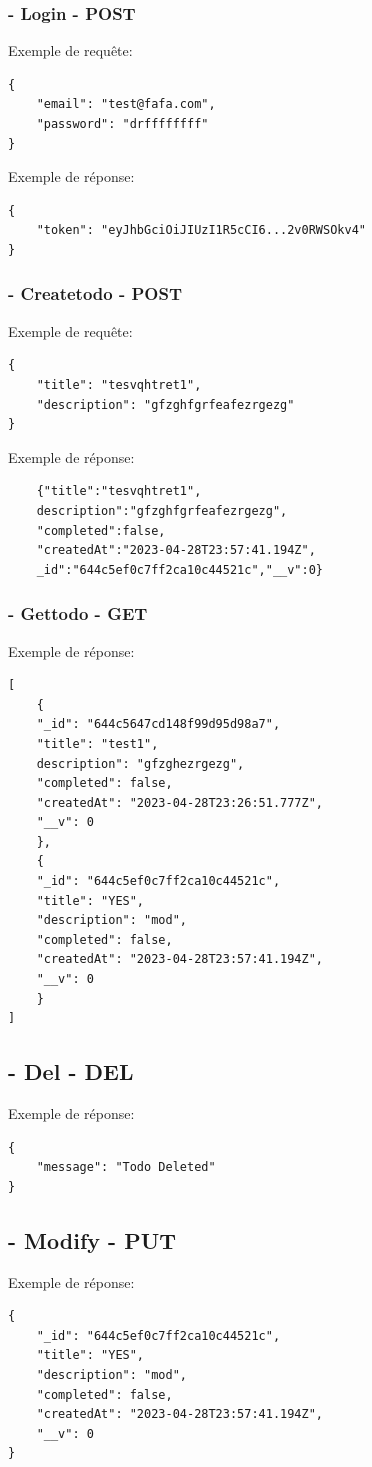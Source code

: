 \documentclass[a4paper,12pt]{report}
\begin{document}
\subsubsection{- Login - POST}
Exemple de requête:
\begin{lstlisting}
{
  	"email": "test@fafa.com",
  	"password": "drffffffff"
}
\end{lstlisting}

Exemple de réponse:
\begin{lstlisting}
{
	"token": "eyJhbGciOiJIUzI1R5cCI6...2v0RWSOkv4"
}
\end{lstlisting}
\subsubsection{- Createtodo - POST}
Exemple de requête:
\begin{lstlisting}
{
	"title": "tesvqhtret1",
	"description": "gfzghfgrfeafezrgezg"
}
\end{lstlisting}

Exemple de réponse:
\begin{lstlisting}
	{"title":"tesvqhtret1",
	description":"gfzghfgrfeafezrgezg",
	"completed":false,
	"createdAt":"2023-04-28T23:57:41.194Z",
	_id":"644c5ef0c7ff2ca10c44521c","__v":0}
\end{lstlisting}

\subsubsection{- Gettodo - GET}
Exemple de réponse:
\begin{lstlisting}
[
	{
	"_id": "644c5647cd148f99d95d98a7",
	"title": "test1",
	description": "gfzghezrgezg",
	"completed": false,
	"createdAt": "2023-04-28T23:26:51.777Z",
	"__v": 0
	},
	{
	"_id": "644c5ef0c7ff2ca10c44521c",
	"title": "YES",
	"description": "mod",
	"completed": false,
	"createdAt": "2023-04-28T23:57:41.194Z",
	"__v": 0
	}
]
\end{lstlisting}

\subsection{- Del - DEL}
Exemple de réponse:
\begin{lstlisting}
{
	"message": "Todo Deleted"
}
\end{lstlisting}

\subsection{- Modify - PUT}
Exemple de réponse:
\begin{lstlisting}
{
	"_id": "644c5ef0c7ff2ca10c44521c",
	"title": "YES",
	"description": "mod",
	"completed": false,
	"createdAt": "2023-04-28T23:57:41.194Z",
	"__v": 0
}
\end{lstlisting}
\end{document}
